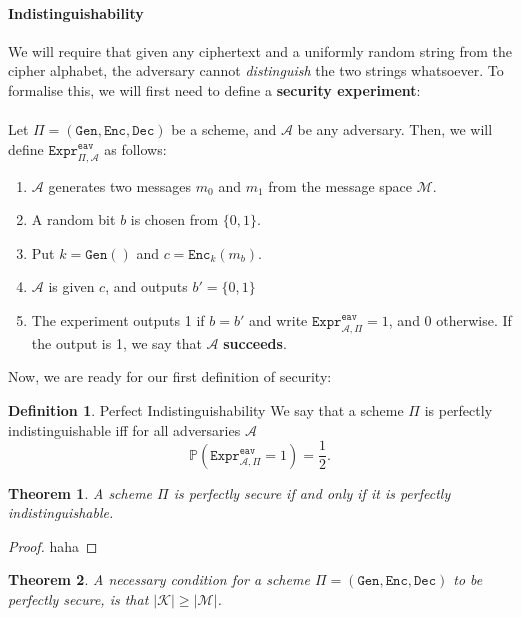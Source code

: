 \documentclass{article}
\newtheorem{theorem}{Theorem}[section]
\theoremstyle{definition}
\newtheorem{definition}{Definition}[section]
\newcommand{\Enc}{\texttt{Enc}}
\newcommand{\Dec}{\texttt{Dec}}
\newcommand{\Gen}{\texttt{Gen}}
\newcommand{\M}{\mathcal{M}}
\newcommand{\K}{\mathcal{K}}
\newcommand{\A}{\mathcal{A}}
\newcommand{\Prob}{\mathbb{P}}
\newcommand{\Expr}[2]{\texttt{Expr}^{\texttt{#1}}_{#2}}
\begin{document}
\paragraph{Indistinguishability} We will require that given any ciphertext and a uniformly
random string from the cipher alphabet, the adversary cannot
\textit{distinguish} the two strings whatsoever. To formalise this, we will
first need to define a \textbf{security experiment}:
\paragraph{}
Let $\Pi = (\Gen, \Enc, \Dec)$ be a scheme, and $\A$ be any adversary.
Then, we will define $\texttt{Expr}^{\texttt{eav}}_{\Pi, \A}$ as
follows:
\begin{enumerate}
\item $\A$ generates two messages $m_0$ and $m_1$ from the message space $\M$.
\item A random bit $b$ is chosen from $\{0, 1\}$.
\item Put $k = \Gen()$ and $c = \Enc_k(m_b)$.
\item $\A$ is given $c$, and outputs $b'= \{0, 1\}$
\item The experiment outputs 1 if $b = b'$ and write $\Expr{eav}{\A, \Pi} = 1$,
  and 0 otherwise. If the output is 1, we say that $\A$ \textbf{succeeds}.
\end{enumerate}
Now, we are ready for our first definition of security:
\begin{definition}{Perfect Indistinguishability}
  \label{def:perfect_indistinguishability}
We say that a scheme $\Pi$ is perfectly indistinguishable iff for all adversaries $\A$
\[
  \Prob(\Expr{eav}{\A, \Pi} = 1) = \frac12.
\]
\end{definition}
\begin{theorem}
  \label{thm:perfect_equivalence}
A scheme $\Pi$ is perfectly secure if and only if it is perfectly indistinguishable.
\end{theorem}
\begin{proof}
  haha
\end{proof}
\begin{theorem}
A necessary condition for a scheme $\Pi = (\Gen, \Enc, \Dec)$ to be perfectly secure, is that $|\K|
\geq |\M|$.
\end{theorem}
\end{document}
